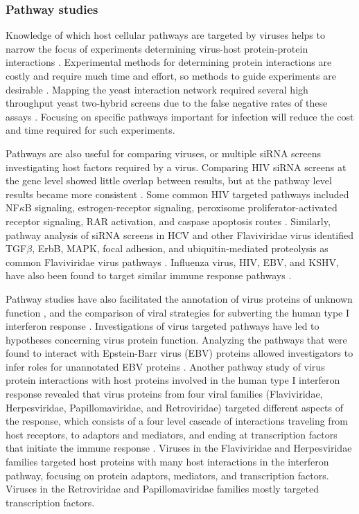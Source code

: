 \subsubsection{Pathway studies}

Knowledge of which host cellular pathways are targeted by viruses
helps to narrow the focus of experiments determining virus-host
protein-protein interactions \cite{lee2004probabilistic}. Experimental
methods for determining protein interactions are costly and require
much time and effort, so methods to guide experiments are desirable
\cite{skrabanek2008computational}. Mapping the yeast interaction
network required several high throughput yeast two-hybrid screens due
to the false negative rates of these assays
\cite{collins2007toward,huang2009precision}. Focusing on specific
pathways important for infection will reduce the cost and time
required for such experiments.

Pathways are also useful for comparing viruses, or multiple siRNA
screens investigating host factors required by a virus. Comparing HIV
siRNA screens at the gene level showed little overlap between results,
but at the pathway level results became more consistent
\cite{yeung09}. Some common HIV targeted pathways included NF$\kappa$B
signaling, estrogen-receptor signaling, peroxisome
proliferator-activated receptor signaling, RAR activation, and caspase
apoptosis routes \cite{yeung09}. Similarly, pathway analysis of siRNA
screens in HCV and other Flaviviridae virus identified TGF$\beta$,
ErbB, MAPK, focal adhesion, and ubiquitin-mediated proteolysis as
common Flaviviridae virus pathways \cite{Li09}. Influenza virus, HIV,
EBV, and KSHV, have also been found to target similar immune response
pathways \cite{shapira2009physical,brander2000modulation}.

Pathway studies have also facilitated the annotation of virus proteins
of unknown function \cite{calderwood07}, and the comparison of viral
strategies for subverting the human type I interferon response
\cite{navratil-system}. Investigations of virus targeted pathways have
led to hypotheses concerning virus protein function. Analyzing the
pathways that were found to interact with Epstein-Barr virus (EBV)
proteins allowed investigators to infer roles for unannotated EBV
proteins \cite{calderwood07}. Another pathway study of virus protein
interactions with host proteins involved in the human type I
interferon response revealed that virus proteins from four viral
families (Flaviviridae, Herpesviridae, Papillomaviridae, and
Retroviridae) targeted different aspects of the response, which
consists of a four level cascade of interactions traveling from host
receptors, to adaptors and mediators, and ending at transcription
factors that initiate the immune response
\cite{navratil-system}. Viruses in the Flaviviridae and Herpesviridae
families targeted host proteins with many host interactions in the
interferon pathway, focusing on protein adaptors, mediators, and
transcription factors. Viruses in the Retroviridae and
Papillomaviridae families mostly targeted transcription factors.

